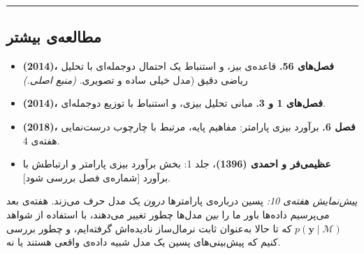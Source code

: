 \begin{center}\rule{0.5\linewidth}{0.5pt}\end{center}

\subsection{مطالعه‌ی بیشتر}

\begin{itemize}
\tightlist
\item
  \textbf{ (2014)، فصل‌های 5\lr{--}6.} قاعده‌ی بیز، و استنباط یک
  احتمال دوجمله‌ای با تحلیل ریاضی دقیق (مدل  خیلی
  ساده و تصویری. \emph{(منبع اصلی.)}
\item
  \textbf{ \lr{\&}  (2014)، فصل‌های 1 و 3.} مبانی
  تحلیل بیزی، و استنباط با توزیع دوجمله‌ای.
\item
  \textbf{ \lr{\&}  (2018)، فصل 6.} برآورد بیزی
  پارامتر: مفاهیم پایه، مرتبط با چارچوب درست‌نمایی هفته‌ی 4.
\item
  \textbf{عظیمی‌فر و احمدی (1396)}، جلد 1: بخش برآورد بیزی پارامتر و
  ارتباطش با برآورد  {[}شماره‌ی فصل بررسی شود{]}.
\end{itemize}

\emph{پیش‌نمایش هفته‌ی 10:} پسین درباره‌ی پارامترها \emph{درون} یک مدل حرف
می‌زند. هفته‌ی بعد می‌پرسیم داده‌ها باور ما را \emph{بین} مدل‌ها چطور تغییر
می‌دهند، با استفاده از شواهد \(p(\mathbf{y}\mid\mathcal{M})\) که تا حالا
به‌عنوان ثابت نرمال‌ساز نادیده‌اش گرفته‌ایم، و چطور بررسی کنیم که پیش‌بینی‌های
پسین یک مدل شبیه داده‌ی واقعی هستند یا نه.
